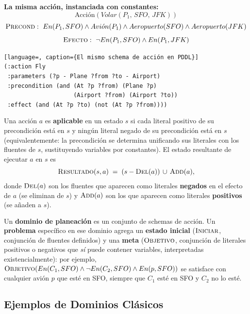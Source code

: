 \textbf{La misma acción, instanciada con constantes:}
\[
    \text{Acci\'on}(Volar(P_1,\,SFO,\,JFK))
\]
\[
    \textsc{Precond}:\ En(P_1,SFO)\land Avi\acute{o}n(P_1)\land Aeropuerto(SFO)\land
    Aeropuerto(JFK)
\]
\[
    \textsc{Efecto}:\ \neg En(P_1,SFO)\land En(P_1,JFK)
\]

\begin{lstlisting}[language=, caption={El mismo schema de acción en PDDL}]
(:action Fly
 :parameters (?p - Plane ?from ?to - Airport)
 :precondition (and (At ?p ?from) (Plane ?p)
                    (Airport ?from) (Airport ?to))
 :effect (and (At ?p ?to) (not (At ?p ?from))))
\end{lstlisting}

\begin{definition}
Una acción $a$ es \textbf{aplicable} en un estado $s$ si cada literal positivo de su precondición
está en $s$ y ningún literal negado de su precondición está en $s$ (equivalentemente: la precondición
se determina unificando sus literales con los fluentes de $s$, sustituyendo variables por
constantes). El estado resultante de ejecutar $a$ en $s$ es
\[
    \textsc{Resultado}(s,a) \;=\; (s - \textsc{Del}(a)) \,\cup\, \textsc{Add}(a),
\]
donde $\textsc{Del}(a)$ son los fluentes que aparecen como literales \textbf{negados} en el efecto de
$a$ (se eliminan de $s$) y $\textsc{Add}(a)$ son los que aparecen como literales \textbf{positivos}
(se añaden a $s$).
\end{definition}

Un \textbf{dominio de planeación} es un conjunto de schemas de acción. Un \textbf{problema}
específico en ese dominio agrega un \textbf{estado inicial} ($\textsc{Iniciar}$, conjunción de
fluentes definidos) y una \textbf{meta} ($\textsc{Objetivo}$, conjunción de literales positivos o
negativos que \emph{sí} puede contener variables, interpretadas existencialmente): por ejemplo,
$\textsc{Objetivo}(En(C_1,SFO)\land\neg En(C_2,SFO)\land En(p,SFO))$ se satisface con cualquier avión
$p$ que esté en SFO, siempre que $C_1$ esté en SFO y $C_2$ no lo esté.

\subsection{Ejemplos de Dominios Clásicos}

